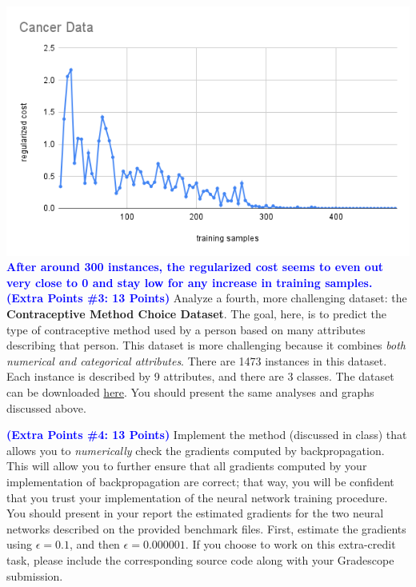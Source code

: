\documentclass[letterpaper]{article}
\newcommand{\HIGHLIGHT}[1]{\textcolor{blue}{\textbf{#1}}}
\begin{document}
\includegraphics[scale=.75]{Cancer Data.png} \\

\HIGHLIGHT{After around 300 instances, the regularized cost seems to even out very close to 0 and stay low for any increase in training samples.} \\



\noindent \HIGHLIGHT{(Extra Points \#3: 13 Points)}    
Analyze a fourth, more challenging dataset: the \textbf{Contraceptive Method Choice Dataset}. The goal, here, is to predict the type of contraceptive method used by a person based on many attributes describing that person. This dataset is more challenging because it combines \textit{both numerical and categorical attributes}. There are 1473 instances in this dataset. Each instance is described by 9 attributes, and there are 3 classes. The dataset can be downloaded \href{https://archive.ics.uci.edu/ml/datasets/Contraceptive+Method+Choice}{here}. You should present the same analyses and graphs discussed above.

\noindent \HIGHLIGHT{(Extra Points \#4: 13 Points)}
Implement the method (discussed in class) that allows you to \textit{numerically} check the gradients computed by backpropagation. This will allow you to further ensure that all gradients computed by your implementation of backpropagation are correct; that way, you will be confident that you trust your implementation of the neural network training procedure. You should present in your report the estimated gradients for the two neural networks described on the provided benchmark files. First, estimate the gradients using $\epsilon=0.1$, and then $\epsilon=0.000001$. If you choose to work on this extra-credit task, please include the corresponding source code along with your Gradescope submission.
\end{document}
